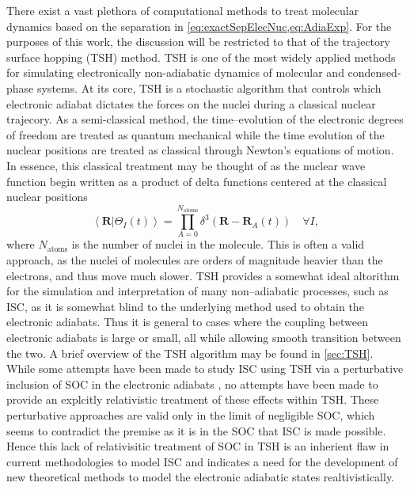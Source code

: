 \documentclass[12pt]{article}
\newcommand{\inner}[2]{\left\langle #1 \left\vert\right. #2 \right\rangle}            %
\newcommand*\vc[1]{\boldsymbol{#1}}
\begin{document}
There exist a vast plethora of computational methods to treat molecular dynamics
based on the separation in \cref{eq:exactSepElecNuc,eq:AdiaExp}. For the
purposes of this work, the discussion will be restricted to that of the
trajectory surface hopping (TSH) method.  TSH is one of the most widely applied
methods for simulating electronically non-adiabatic dynamics of molecular and
condensed-phase systems.\cite{Barbatti11_1759, Tavernelli14_62, Tully12_22A301,
Tully98_407, Hynes14_97} At its core, TSH is a stochastic algorithm that
controls which electronic adiabat dictates the forces on the nuclei during a
classical nuclear trajecory.\cite{Preston71_562} As a semi-classical method, the
time--evolution of the electronic degrees of freedom are treated as quantum
mechanical while the time evolution of the nuclear positions are treated as
classical through Newton's equations of motion. In essence, this classical
treatment may be thought of as the nuclear wave function begin written as a
product of delta functions centered at the classical nuclear positions
\begin{equation}
\inner{\vc{R}}{\Theta_I (t)} = 
  \prod_{A = 0}^{N_\mathrm{atoms}} \delta^3(\vc{R} - \vc{R}_A(t))
  \quad \forall I,
  \label{eq:ClassicalNuclei}
\end{equation}
where $N_\mathrm{atoms}$ is the number of nuclei in the molecule.  This is often
a valid approach, as the nuclei of molecules are orders of magnitude heavier
than the electrons, and thus move much slower. TSH provides a somewhat ideal
altorithm for the simulation and interpretation of many non--adiabatic
processes, such as ISC, as it is somewhat blind to the underlying method used to
obtain the electronic adiabats. Thus it is general to cases where the coupling
between electronic adiabats is large or small, all while allowing smooth
transition between the two. A brief overview of the TSH algorithm may be found
in \cref{sec:TSH}. While some attempts have been made to study ISC using TSH via
a perturbative inclusion of SOC in the electronic adiabats
\cite{Thiel14_JCP124101}, no attempts have been made to provide an explcitly
relativistic treatment of these effects within TSH. These perturbative
approaches are valid only in the limit of negligible SOC, which seems to
contradict the premise as it is in the SOC that ISC is made possible. Hence this
lack of relativisitic treatment of SOC in TSH is an inherient flaw in current
methodologies to model ISC and indicates a need for the development of new
theoretical methods to model the electronic adiabatic states realtivistically.
\end{document}
